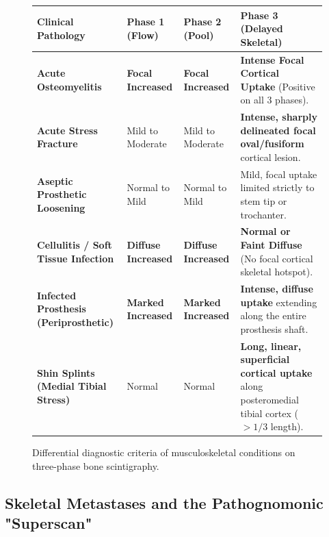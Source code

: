 \documentclass[11pt,a4paper]{article}
\begin{document}
\begin{figure}[htbp]
\centering
\setlength{\tabcolsep}{4pt}
\begin{tabular}{p{3.8cm}p{2.6cm}p{2.8cm}p{5.2cm}}
\toprule
\textbf{Clinical Pathology} & \textbf{Phase 1 (Flow)} & \textbf{Phase 2 (Pool)} & \textbf{Phase 3 (Delayed Skeletal)} \\
\midrule
\textbf{Acute Osteomyelitis} & \textbf{Focal Increased} & \textbf{Focal Increased} & \textbf{Intense Focal Cortical Uptake} (Positive on all 3 phases). \\
\addlinespace
\textbf{Acute Stress Fracture} & Mild to Moderate & Mild to Moderate & \textbf{Intense, sharply delineated focal oval/fusiform} cortical lesion. \\
\addlinespace
\textbf{Aseptic Prosthetic Loosening} & Normal to Mild & Normal to Mild & Mild, focal uptake limited strictly to stem tip or trochanter. \\
\addlinespace
\textbf{Cellulitis / Soft Tissue Infection} & \textbf{Diffuse Increased} & \textbf{Diffuse Increased} & \textbf{Normal or Faint Diffuse} (No focal cortical skeletal hotspot). \\
\addlinespace
\textbf{Infected Prosthesis (Periprosthetic)} & \textbf{Marked Increased} & \textbf{Marked Increased} & \textbf{Intense, diffuse uptake} extending along the entire prosthesis shaft. \\
\addlinespace
\textbf{Shin Splints (Medial Tibial Stress)} & Normal & Normal & \textbf{Long, linear, superficial cortical uptake} along posteromedial tibial cortex ($> 1/3$ length). \\
\bottomrule
\end{tabular}
\caption{Differential diagnostic criteria of musculoskeletal conditions on three-phase bone scintigraphy.}
\label{tab:bone_ddx}
\end{figure}

\subsection{Skeletal Metastases and the Pathognomonic "Superscan"}
\end{document}
